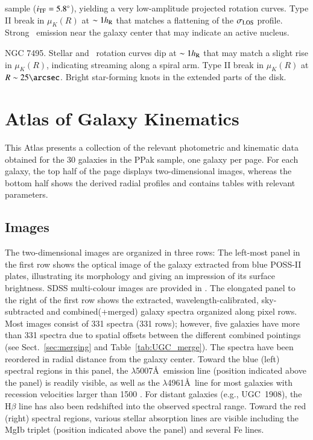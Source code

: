 \documentclass[traditabstract]{aa} %
\begin{document}
\begin{list}{}
  sample ($i_{\rm TF}=5.8\mbox{$^\circ$}$), yielding a very low-amplitude projected rotation
  curves.  Type II break in $\mu_K(R)$ at $\sim1h_{\rm R}$ that matches a flattening
  of the $\sigma_{\rm LOS}$ profile.  Strong \oiii\ emission near the galaxy center that
  may indicate an active nucleus.
%
  \item[{\bf UGC 12391:}] NGC 7495.  Stellar and \oiii\ rotation curves dip at
  $\sim1h_{\rm R}$ that may match a slight rise in $\mu_K(R)$, indicating streaming
  along a spiral arm.  Type II break in $\mu_K(R)$ at $R\sim25\arcsec$.  Bright
  star-forming knots in the extended parts of the disk.
%
\end{list}



\section{Atlas of Galaxy Kinematics}
\label{app:atlas}

This Atlas presents a collection of the relevant photometric and kinematic data
obtained for the 30 galaxies in the PPak sample, one galaxy per page.  For each
galaxy, the top half of the page displays two-dimensional images, whereas the
bottom half shows the derived radial profiles and contains tables with relevant
parameters.

\subsection{Images}

The two-dimensional images are organized in three rows:  The left-most panel in
the first row shows the optical image of the galaxy extracted from blue POSS-II
plates, illustrating its morphology and giving an impression of its surface
brightness.  SDSS multi-colour images are provided in
.  The elongated panel to the right of the first row
shows the extracted, wavelength-calibrated, sky-subtracted and combined(+merged)
galaxy spectra organized along pixel rows.  Most images consist of 331 spectra
(331 rows); however, five galaxies have more than 331 spectra due to spatial
offsets between the different combined pointings (see Sect.~\ref{sec:merging}
and Table~\ref{tab:UGC_merge}). The spectra have been reordered in radial distance
from the galaxy center. Toward the blue (left) spectral regions in this
panel, the \oiii$\lambda$5007\AA\ emission line (position indicated above the panel)
is readily visible, as well as the \oiii$\lambda$4961\AA\ line for most galaxies
with recession velocities larger than 1500 \kms.  For distant galaxies (e.g.,
UGC~1908), the H$\beta$ line has also been redshifted into the observed spectral
range.  Toward the red (right) spectral regions, various stellar absorption lines
are visible including the MgIb triplet (position indicated above the panel) and
several Fe lines.
\end{document}
